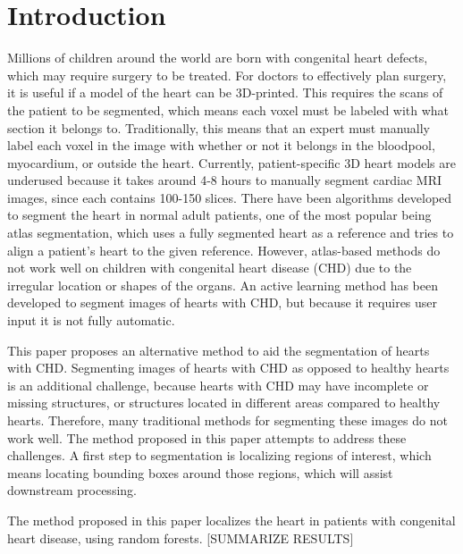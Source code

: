 \section{Introduction}
Millions of children around the world are born with congenital heart defects, which may require surgery to be treated. For doctors to effectively plan surgery, it is useful if a model of the heart can be 3D-printed. This requires the scans of the patient to be segmented, which means each voxel must be labeled with what section it belongs to. Traditionally, this means that an expert must manually label each voxel in the image with whether or not it belongs in the bloodpool, myocardium, or outside the heart. Currently, patient-specific 3D heart models are underused because it takes around 4-8 hours to manually segment cardiac MRI images, since each contains 100-150 slices. There have been algorithms developed to segment the heart in normal adult patients, one of the most popular being atlas segmentation, which uses a fully segmented heart as a reference and tries to align a patient's heart to the given reference. However, atlas-based methods do not work well on children with congenital heart disease (CHD) due to the irregular location or shapes of the organs. An active learning method has been developed to segment images of hearts with CHD, but because it requires user input it is not fully automatic.

This paper proposes an alternative method to aid the segmentation of hearts with CHD. Segmenting images of hearts with CHD as opposed to healthy hearts is an additional challenge, because hearts with CHD may have incomplete or missing structures, or structures located in different areas compared to healthy hearts. Therefore, many traditional methods for segmenting these images do not work well. The method proposed in this paper attempts to address these challenges. A first step to segmentation is localizing regions of interest, which means locating bounding boxes around those regions, which will assist downstream processing.

The method proposed in this paper localizes the heart in patients with congenital heart disease, using random forests. [SUMMARIZE RESULTS]

